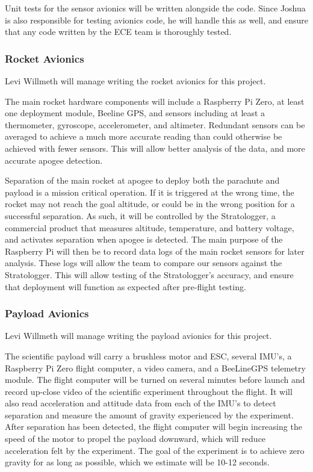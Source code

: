 \documentclass[onecolumn, draftclsnofoot, 10pt, compsoc]{IEEEtran}
\begin{document}
Unit tests for the sensor avionics will be written alongside the code. Since Joshua is also responsible for testing avionics code, he will handle this as well, and ensure that any code written by the ECE team is thoroughly tested.

\subsubsection{Rocket Avionics}

Levi Willmeth will manage writing the rocket avionics for this project.

The main rocket hardware components will include a Raspberry Pi Zero, at least one deployment module, Beeline GPS, and sensors including at least a thermometer, gyroscope, accelerometer,  and altimeter. Redundant sensors can be averaged to achieve a much more accurate reading than could otherwise be achieved with fewer sensors. This will allow better analysis of the data, and more accurate apogee detection.

Separation of the main rocket at apogee to deploy both the parachute and payload is a mission critical operation. If it is triggered at the wrong time, the rocket may not reach the goal altitude, or could be in the wrong position for a successful separation. As such, it will be controlled by the Stratologger, a commercial product that measures altitude, temperature, and battery voltage, and activates separation when apogee is detected. The main purpose of the Raspberry Pi will then be to record data logs of the main rocket sensors for later analysis. These logs will allow the team to compare our sensors against the Stratologger. This will allow testing of the Stratologger’s accuracy, and ensure that deployment will function as expected after pre-flight testing. 

\subsubsection{Payload Avionics}

Levi Willmeth will manage writing the payload avionics for this project.

The scientific payload will carry a brushless motor and ESC, several IMU's, a Raspberry Pi Zero flight computer, a video camera, and a BeeLineGPS telemetry module.  The flight computer will be turned on several minutes before launch and record up-close video of the scientific experiment throughout the flight.  It will also read acceleration and attitude data from each of the IMU's to detect separation and measure the amount of gravity experienced by the experiment.  After separation has been detected, the flight computer will begin increasing the speed of the motor to propel the payload downward, which will reduce acceleration felt by the experiment.  The goal of the experiment is to achieve zero gravity for as long as possible, which we estimate will be 10-12 seconds.
\end{document}
